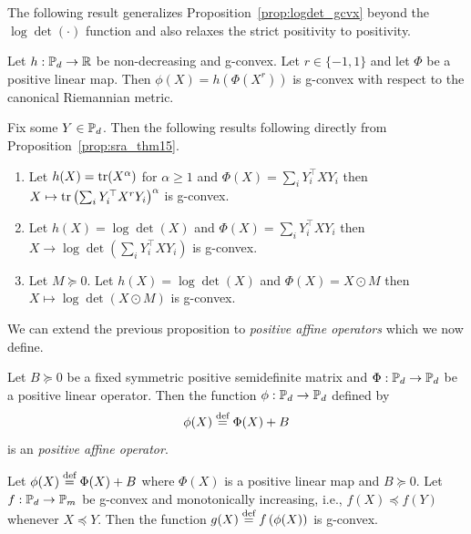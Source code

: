 \documentclass[twoside,11pt]{article}
\begin{document}
%
The following result generalizes Proposition~\ref{prop:logdet_gcvx} beyond the $\log \det (\cdot)$ function and also relaxes the strict positivity to positivity.
%
\begin{prop}\label{prop:sra_thm15}
Let $h: \mathbb{P}_d \to \mathbb{R}$ be non-decreasing and g-convex. Let $r \in \{-1, 1\}$ and let $\Phi$ be a positive linear map. Then $\phi(X) = h\left(\Phi(X^r)\right)$ is g-convex with respect to the canonical Riemannian metric.
\end{prop}
%
\begin{example}
Fix some $Y \in \mathbb{P}_d$. Then the following results following directly from Proposition~\ref{prop:sra_thm15}.
\begin{enumerate}
    \item Let $h(X) = \text{tr}(X^\alpha)$ for $\alpha \geq 1$ and $\Phi(X) = \sum_i Y_i^\top X Y_i$ then  $X \mapsto \text{tr}\left( \sum_i Y_i^\top X^r Y_i\right)^\alpha$ is g-convex.
    \item Let $h(X) = \log \det (X)$ and $\Phi(X) = \sum_i Y_i^\top X Y_i$ then $X \to \log \det\left(\sum_i Y_i^\top X Y_i\right)$ is g-convex.
    \item Let $M \succeq 0$. Let $h(X) = \log \det(X)$ and $\Phi(X) = X \odot M$ then
    $X \mapsto \log \det \left( X \odot M\right)$
    is g-convex.
\end{enumerate}
\end{example}

We can extend the previous proposition to \textit{positive affine operators} which we now define.

\begin{definition}
    Let $B \succeq 0$ be a fixed symmetric positive semidefinite matrix and $\Phi: \mathbb{P}_d \to \mathbb{P}_d$ be a positive linear operator. Then the function $\phi:\mathbb{P}_d \to \mathbb{P}_d$ defined by 
    \[
    \phi(X) \stackrel{\text{def}}{=} \Phi(X) + B
    \]
    is an \textit{positive affine operator}.
\end{definition}

\begin{prop}\label{prop:gcvx_affine_positive}

    Let  $\phi(X) \stackrel{\text{def}}{=} \Phi(X) + B$ where $\Phi(X)$ is a positive linear map and $B \succeq 0$. 
        Let $f: \mathbb{P}_d \to \mathbb{P}_m$ be g-convex and monotonically increasing, i.e., $f(X) \preceq f(Y)$ whenever $X \preceq Y$. Then the function
        $g(X) \stackrel{\text{def}}{=} f\left( \phi(X)\right)$
        is g-convex.
\end{prop}
\end{document}
